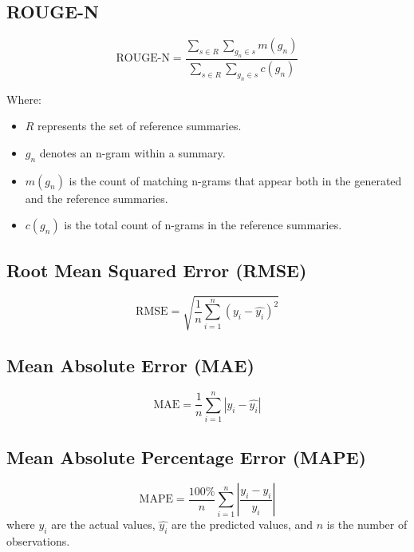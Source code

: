 \documentclass[conference]{IEEEtran}
\begin{document}
\subsection*{ROUGE-N}

\begin{equation*}
\text{ROUGE-N} = \frac{\sum_{s \in R} \sum_{g_n \in s} m(g_n)}{\sum_{s \in R} \sum_{g_n \in s} c(g_n)}
\end{equation*}

Where:
\begin{itemize}
    \item \( R \) represents the set of reference summaries.
    \item \( g_n \) denotes an n-gram within a summary.
    \item \( m(g_n) \) is the count of matching n-grams that appear both in the generated and the reference summaries.
    \item \( c(g_n) \) is the total count of n-grams in the reference summaries.
\end{itemize}

\subsection*{Root Mean Squared Error (RMSE)}

\begin{equation}
\text{RMSE} = \sqrt{\frac{1}{n}\sum_{i=1}^{n}(y_i - \hat{y_i})^2}
\end{equation}

\subsection*{Mean Absolute Error (MAE)}

\begin{equation}
\text{MAE} = \frac{1}{n}\sum_{i=1}^{n}\left|y_i - \hat{y_i}\right|
\end{equation}

\subsection*{Mean Absolute Percentage Error (MAPE)}

\begin{equation}
\text{MAPE} = \frac{100\%}{n}\sum_{i=1}^{n}\left|\frac{y_i - \hat{y_i}}{y_i}\right|
\end{equation}
where \( y_i \) are the actual values, \( \hat{y_i} \) are the predicted values, and \( n \) is the number of observations.
\end{document}
